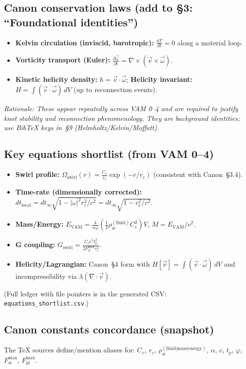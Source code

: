 \documentclass[11pt]{article}
\begin{document}
\subsection{Canon conservation laws (add to \S3: ``Foundational identities'')}
\begin{itemize}
    \item \textbf{Kelvin circulation (inviscid, barotropic):} $\frac{d\Gamma}{dt} = 0$ along a material loop.
    \item \textbf{Vorticity transport (Euler):} $\frac{\partial\vec{\omega}}{\partial t} = \nabla \times (\vec{v} \times \vec{\omega})$.
    \item \textbf{Kinetic helicity density:} $h = \vec{v} \cdot \vec{\omega}$; \textbf{Helicity invariant:} $H = \int (\vec{v} \cdot \vec{\omega})\,dV$ (up to reconnection events).
\end{itemize}
\textit{Rationale: These appear repeatedly across VAM 0--4 and are required to justify knot stability and reconnection phenomenology. They are background identities; use BibTeX keys in~\S9 (Helmholtz/Kelvin/Moffatt).}

\subsection{Key equations shortlist (from VAM 0--4)}
\begin{itemize}
    \item \textbf{Swirl profile:} $\Omega_{\text{swirl}}(r) = \frac{C_e}{r_c} \exp(-r/r_c)$ (consistent with Canon~\S3.4).
    \item \textbf{Time-rate (dimensionally corrected):} $dt_{\text{local}} = dt_{\infty} \sqrt{1 - |\omega|^2 r_c^2 / c^2} = dt_{\infty} \sqrt{1 - v_t^2/c^2}$.
    \item \textbf{Mass/Energy:} $E_{\text{VAM}} = \frac{4}{\alpha\varphi} \left(\frac{1}{2} \rho_{\text{\ae}}^{(\text{fluid})} C_e^2\right) V$, $M = E_{\text{VAM}}/c^2$.
    \item \textbf{G coupling:} $G_{\text{swirl}} = \frac{C_e c^5 t_p^2}{2 F_{\text{\ae}}^{\max} r_c^2}$.
    \item \textbf{Helicity/Lagrangian:} Canon~\S4 form with $H[\vec{v}] = \int (\vec{v} \cdot \vec{\omega})\,dV$ and incompressibility via $\lambda (\nabla\cdot\vec{v})$.
\end{itemize}
(Full ledger with file pointers is in the generated CSV: \texttt{equations\_shortlist.csv}.)

\subsection{Canon constants concordance (snapshot)}
The TeX sources define/mention aliases for: $C_e$, $r_c$, $\rho_{\text{\ae}}^{(\text{fluid|mass|energy})}$, $\alpha$, $c$, $t_p$, $\varphi$, $F_{\text{\ae}}^{\max}$, $F_{\text{gr}}^{\max}$.
\end{document}
